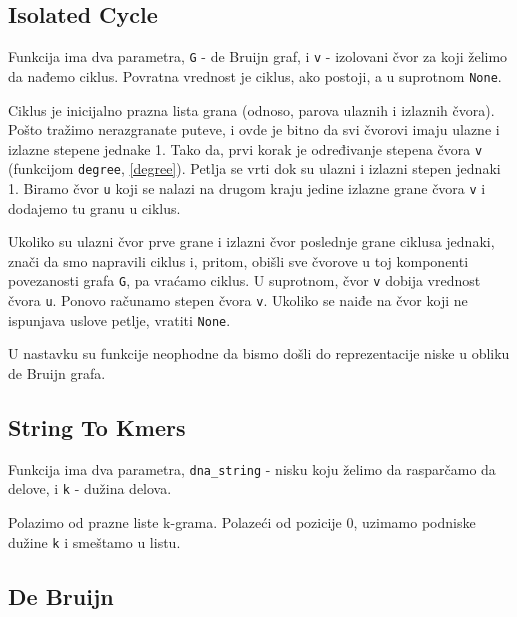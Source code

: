


\subsection{Isolated Cycle}
\label{isolatedCycle}

Funkcija ima dva parametra, \texttt{G} - de Bruijn graf, i \texttt{v} - izolovani čvor za koji želimo da nađemo ciklus. Povratna vrednost je ciklus, ako postoji, a u suprotnom \texttt{None}.

Ciklus je inicijalno prazna lista grana (odnoso, parova ulaznih i izlaznih čvora). Pošto tražimo nerazgranate puteve, i ovde je bitno da svi čvorovi imaju ulazne i izlazne stepene jednake 1. Tako da, prvi korak je određivanje stepena čvora \texttt{v} (funkcijom \texttt{degree}, \ref{degree}). Petlja se vrti dok su ulazni i izlazni stepen jednaki 1. Biramo čvor \texttt{u} koji se nalazi na drugom kraju jedine izlazne grane čvora \texttt{v} i dodajemo tu granu u ciklus. 

Ukoliko su ulazni čvor prve grane i izlazni čvor poslednje grane ciklusa jednaki, znači da smo napravili ciklus i, pritom, obišli sve čvorove u toj komponenti povezanosti grafa \texttt{G}, pa vraćamo ciklus. U suprotnom, čvor \texttt{v} dobija vrednost čvora \texttt{u}. Ponovo računamo stepen čvora \texttt{v}. Ukoliko se naiđe na čvor koji ne ispunjava uslove petlje, vratiti \texttt{None}.



U nastavku su funkcije neophodne da bismo došli do reprezentacije niske u obliku de Bruijn grafa.


\subsection{String To Kmers}
\label{stringToKmers}

Funkcija ima dva parametra, \texttt{dna\_string} - nisku koju želimo da rasparčamo da delove, i \texttt{k} - dužina delova.

Polazimo od prazne liste k-grama. Polazeći od pozicije 0, uzimamo podniske dužine \texttt{k} i smeštamo u listu.  





\subsection{De Bruijn}
\label{deBruijn}
	
